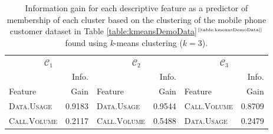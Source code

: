 \documentclass[xcolor={table}]{beamer}
\newcommand{\Toprule}[0]{\hline}
\newcommand{\Midrule}[0]{\hline}
\newcommand{\Botrule}[0]{\hline}
\newcommand{\featN}[1]{\textsc{#1}}
\newcommand{\ourRef}[1]{\ref{#1}$^{\text{\tiny[\pageref{#1}]}}$}
\begin{document}
 \begin{frame} 
\begin{table}[!t]
\caption{Information gain for each descriptive feature as a predictor of membership of each cluster based on the clustering of the mobile phone customer dataset in Table \ourRef{table:kmeansDemoData} found using \textit{k}-means clustering ($k=3$).}
\label{table:explainingClustering_info_gains}
\begin{footnotesize}
{\setlength{\tabcolsep}{0.6em}
\begin{tabular*}{\textwidth}{@{\extracolsep{\fill}} lrlrlr @{}}
\Toprule
 \multicolumn{2}{c}{$\mathcal{C}_1$} &  \multicolumn{2}{c}{$\mathcal{C}_2$} &  \multicolumn{2}{c}{$\mathcal{C}_3$} \\
~ & Info.  & ~ & Info.  & ~ & Info.  \\ 
Feature & Gain & Feature & Gain & Feature & Gain \\ 
\Midrule
\featN{Data.Usage} &  0.9183 & \featN{Data.Usage} &  0.9544 & \featN{Call.Volume} &  0.8709\\ 
\featN{Call.Volume} &  0.2117 & \featN{Call.Volume} &  0.5488 & \featN{Data.Usage} &  0.2479  \\  
\Botrule
\end{tabular*}
}
{}
\end{footnotesize}
\end{table}
\end{frame} 
\end{document}
